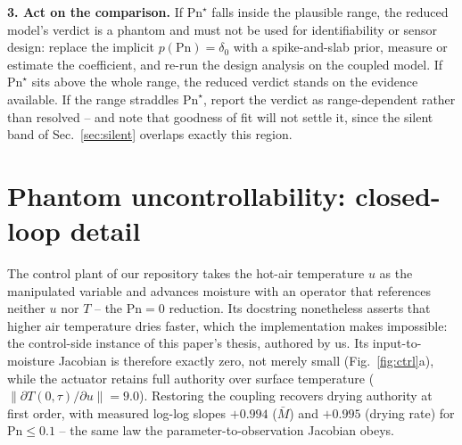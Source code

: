 \documentclass{article}
\begin{document}
\textbf{3. Act on the comparison.} If $\mathrm{Pn}^\star$ falls inside the plausible range, the
reduced model's verdict is a phantom and must not be used for identifiability or sensor design:
replace the implicit $p(\mathrm{Pn}){=}\delta_0$ with a spike-and-slab prior, measure or estimate the
coefficient, and re-run the design analysis on the coupled model. If $\mathrm{Pn}^\star$ sits above
the whole range, the reduced verdict stands on the evidence available. If the range straddles
$\mathrm{Pn}^\star$, report the verdict as range-dependent rather than resolved -- and note that
goodness of fit will not settle it, since the silent band of Sec.~\ref{sec:silent} overlaps exactly
this region.

\section{Phantom uncontrollability: closed-loop detail}\label{app:control}
The control plant of our repository takes the hot-air temperature $u$ as the manipulated variable and
advances moisture with an operator that references neither $u$ nor $T$ -- the $\mathrm{Pn}{=}0$
reduction. Its docstring nonetheless asserts that higher air temperature dries faster, which the
implementation makes impossible: the control-side instance of this paper's thesis, authored by us. Its input-to-moisture Jacobian is therefore exactly zero, not merely small
(Fig.~\ref{fig:ctrl}a), while the actuator retains full authority over surface temperature
($\|\partial T(0,\tau)/\partial u\|=9.0$). Restoring
the coupling recovers drying authority at first order, with measured log-log slopes $+0.994$
($\bar M$) and $+0.995$ (drying rate) for $\mathrm{Pn}\!\le\!0.1$ -- the same law the
parameter-to-observation Jacobian obeys.
\end{document}
